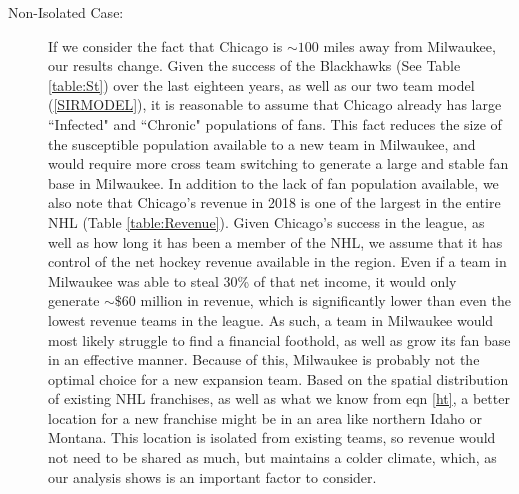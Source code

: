 \documentclass[11pt]{report}            %
\begin{document}
\begin{description}
\item[Non-Isolated Case:] If we consider the fact that Chicago is $\sim 100$ miles away from Milwaukee, our results change. Given the success of the Blackhawks (See Table \ref{table:St}) over the last eighteen years, as well as our two team model (\ref{SIRMODEL}), it is reasonable to assume that Chicago already has large ``Infected" and ``Chronic" populations of fans. This fact reduces the size of the susceptible population available to a new team in Milwaukee, and would require more cross team switching to generate a large and stable fan base in Milwaukee. In addition to the lack of fan population available, we also note that Chicago's revenue in 2018 is one of the largest in the entire NHL (Table \ref{table:Revenue}). Given Chicago's success in the league, as well as how long it has been a member of the NHL, we assume that it has control of the net hockey revenue available in the region. Even if a team in Milwaukee was able to steal 30\% of that net income, it would only generate $\sim \$60$ million in revenue, which is significantly lower than even the lowest revenue teams in the league. As such, a team in Milwaukee would most likely struggle to find a financial foothold, as well as grow its fan base in an effective manner. Because of this, Milwaukee is probably not the optimal choice for a new expansion team. Based on the spatial distribution of existing NHL franchises, as well as what we know from eqn \ref{ht}, a better location for a new franchise might be in an area like northern Idaho or Montana. This location is isolated from existing teams, so revenue would not need to be shared as much, but maintains a colder climate, which, as our analysis shows is an important factor to consider.
\end{description}
\end{document}
